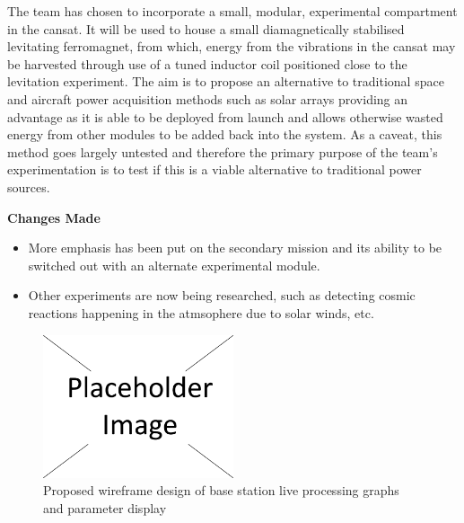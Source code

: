 \documentclass{report}
\begin{document}
		The team has chosen to incorporate a small, modular, experimental
		compartment in the cansat. It will be used to house a small diamagnetically
		stabilised levitating ferromagnet, from which, energy from the vibrations in 
		the cansat may be harvested through use of a tuned inductor coil positioned
		close to the levitation experiment. The aim is to propose an alternative to
		traditional space and aircraft power acquisition methods such as solar arrays
		providing an advantage as it is able to be deployed from launch and allows
		otherwise wasted energy from other modules to be added back into the
		system. As a caveat, this method goes largely untested and therefore the
		primary purpose of the team’s experimentation is to test if this is a viable
		alternative to traditional power sources.\\
		
		

		

		{\color{blue} \textbf{Changes Made}
		\begin{itemize}
			\item More emphasis has been put on the secondary mission and its 
			ability to be switched out with an alternate experimental module.
			\item Other experiments are now being researched, such as detecting
			cosmic reactions happening in the atmsophere due to solar winds, etc.\\
		\end{itemize}
		}

		
		\begin{figure}[H]
			\begin{center}
				\includegraphics[width=0.5\textwidth]{placeholder}
			\end{center}
			\vspace{-10pt}
			\caption{Proposed wireframe design of base station live processing graphs
			and parameter display}
		\end{figure}
\end{document}
